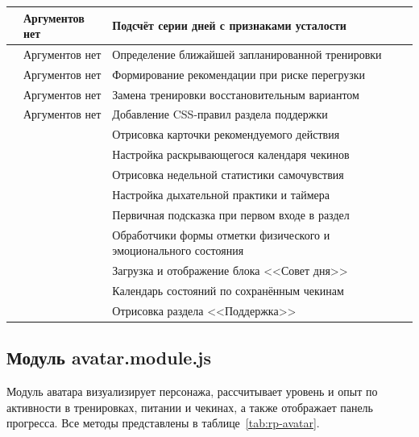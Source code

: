 \begin{xltabular}{\textwidth}{|P{4.4cm}|P{3.4cm}|X|}
	 & Аргументов нет & Подсчёт серии дней с признаками усталости \\ \hline
	 & Аргументов нет & Определение ближайшей запланированной тренировки \\ \hline
	 & Аргументов нет & Формирование рекомендации при риске перегрузки \\ \hline
	 & Аргументов нет & Замена тренировки восстановительным вариантом \\ \hline
	 & Аргументов нет & Добавление CSS-правил раздела поддержки \\ \hline
	 &  & Отрисовка карточки рекомендуемого действия \\ \hline
	 &  & Настройка раскрывающегося календаря чекинов \\ \hline
	 &  & Отрисовка недельной статистики самочувствия \\ \hline
	 &  & Настройка дыхательной практики и таймера \\ \hline
	 &  & Первичная подсказка при первом входе в раздел \\ \hline
	 &  & Обработчики формы отметки физического и эмоционального состояния \\ \hline
	 &  & Загрузка и отображение блока <<Совет дня>> \\ \hline
	 &  & Календарь состояний по сохранённым чекинам \\ \hline
	 &  & Отрисовка раздела <<Поддержка>> \\ \hline
\end{xltabular}

\subsection{Модуль avatar.module.js}

Модуль аватара визуализирует персонажа, рассчитывает уровень и опыт по активности в тренировках, питании и чекинах, а также отображает панель прогресса. Все методы представлены в таблице~\ref{tab:rp-avatar}.

